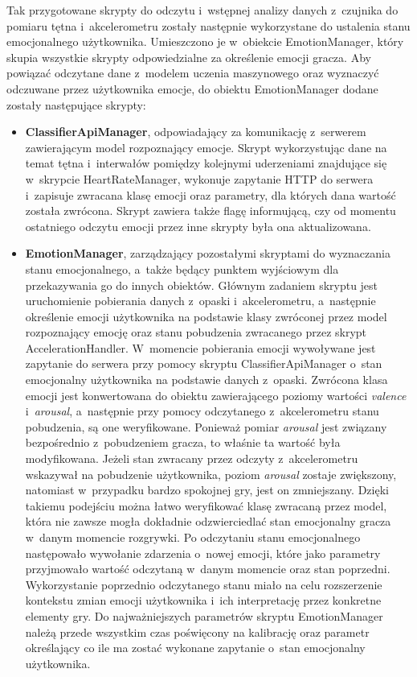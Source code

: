Tak przygotowane skrypty do odczytu i~wstępnej analizy danych z~czujnika do pomiaru tętna i~akcelerometru zostały następnie wykorzystane do ustalenia stanu emocjonalnego użytkownika. Umieszczono je w~obiekcie EmotionManager, który skupia wszystkie skrypty odpowiedzialne za określenie emocji gracza. Aby powiązać odczytane dane z~modelem uczenia maszynowego oraz wyznaczyć odczuwane przez użytkownika emocje, do obiektu EmotionManager dodane zostały następujące skrypty:
\begin{itemize}
	\item \textbf{ClassifierApiManager}, odpowiadający za komunikację z~serwerem zawierającym model rozpoznający emocje. Skrypt wykorzystując dane na temat tętna i~interwałów pomiędzy kolejnymi uderzeniami znajdujące się w~skrypcie HeartRateManager, wykonuje zapytanie HTTP do serwera i~zapisuje zwracana klasę emocji oraz parametry, dla których dana wartość została zwrócona. Skrypt zawiera także flagę informującą, czy od momentu ostatniego odczytu emocji przez inne skrypty była ona aktualizowana.
	\item \textbf{EmotionManager}, zarządzający pozostałymi skryptami do wyznaczania stanu emocjonalnego, a~także będący punktem wyjściowym dla przekazywania go do innych obiektów. Głównym zadaniem skryptu jest uruchomienie pobierania danych z~opaski i~akcelerometru, a~następnie określenie emocji użytkownika na podstawie klasy zwróconej przez model rozpoznający emocję oraz stanu pobudzenia zwracanego przez skrypt AccelerationHandler. W~momencie pobierania emocji wywoływane jest zapytanie do serwera przy pomocy skryptu ClassifierApiManager o~stan emocjonalny użytkownika na podstawie danych z~opaski. Zwrócona klasa emocji jest konwertowana do obiektu zawierającego poziomy wartości \textit{valence} i~\textit{arousal}, a~następnie przy pomocy odczytanego z~akcelerometru stanu pobudzenia, są one weryfikowane. Ponieważ pomiar \textit{arousal} jest związany bezpośrednio z~pobudzeniem gracza, to właśnie ta wartość była modyfikowana. Jeżeli stan zwracany przez odczyty z~akcelerometru wskazywał na pobudzenie użytkownika, poziom \textit{arousal} zostaje zwiększony, natomiast w~przypadku bardzo spokojnej gry, jest on zmniejszany. Dzięki takiemu podejściu można łatwo weryfikować klasę zwracaną przez model, która nie zawsze mogła dokładnie odzwierciedlać stan emocjonalny gracza w~danym momencie rozgrywki. Po odczytaniu stanu emocjonalnego następowało wywołanie zdarzenia o~nowej emocji, które jako parametry przyjmowało wartość odczytaną w~danym momencie oraz stan poprzedni. Wykorzystanie poprzednio odczytanego stanu miało na celu rozszerzenie kontekstu zmian emocji użytkownika i~ich interpretację przez konkretne elementy gry. Do najważniejszych parametrów skryptu EmotionManager należą przede wszystkim czas poświęcony na kalibrację oraz parametr określający co ile ma zostać wykonane zapytanie o~stan emocjonalny użytkownika. 
\end{itemize}

